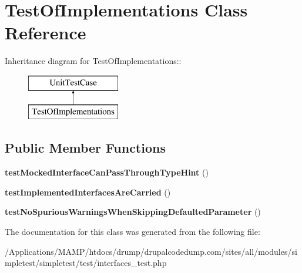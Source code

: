 \hypertarget{class_test_of_implementations}{
\section{TestOfImplementations Class Reference}
\label{class_test_of_implementations}
}
Inheritance diagram for TestOfImplementations::\begin{figure}[H]
\begin{center}
\leavevmode
\includegraphics[height=2cm]{class_test_of_implementations}
\end{center}
\end{figure}
\subsection*{Public Member Functions}
\begin{DoxyCompactItemize}
\item 
\hypertarget{class_test_of_implementations_accdc89b46b0d8978457e41197047da33}{
{\bfseries testMockedInterfaceCanPassThroughTypeHint} ()}
\label{class_test_of_implementations_accdc89b46b0d8978457e41197047da33}

\item 
\hypertarget{class_test_of_implementations_a8a92ea11c2ed1c261a397aee875cb077}{
{\bfseries testImplementedInterfacesAreCarried} ()}
\label{class_test_of_implementations_a8a92ea11c2ed1c261a397aee875cb077}

\item 
\hypertarget{class_test_of_implementations_a5e6f85c628760ab3d7d27ae0083d9871}{
{\bfseries testNoSpuriousWarningsWhenSkippingDefaultedParameter} ()}
\label{class_test_of_implementations_a5e6f85c628760ab3d7d27ae0083d9871}

\end{DoxyCompactItemize}


The documentation for this class was generated from the following file:\begin{DoxyCompactItemize}
\item 
/Applications/MAMP/htdocs/drump/drupalcodedump.com/sites/all/modules/simpletest/simpletest/test/interfaces\_\-test.php\end{DoxyCompactItemize}
